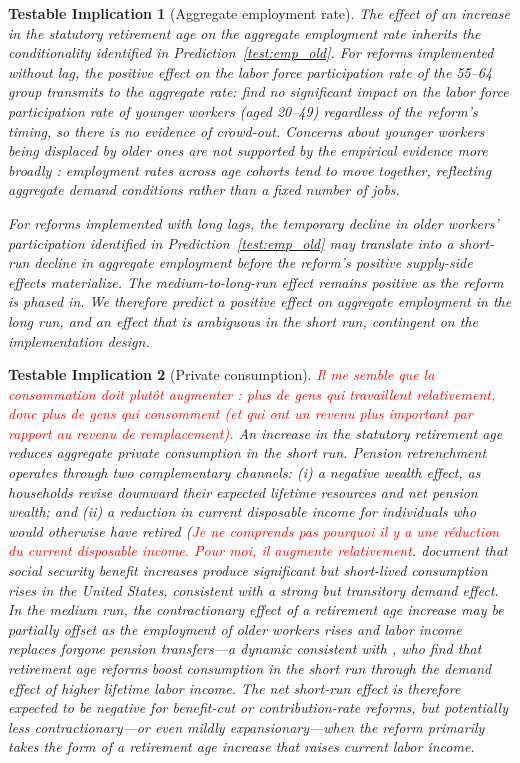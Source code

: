 \documentclass[11pt,english,a4paper, twoside, authoryear]{article}
\newtheorem{testable}{Testable Implication}
\begin{document}
\begin{testable}[Aggregate employment rate]\label{test:emp_agg}
The effect of an increase in the statutory retirement age on the aggregate employment rate inherits the conditionality identified in Prediction~\ref{test:emp_old}. For reforms implemented without lag, the positive effect on the labor force participation rate of the 55--64 group transmits to the aggregate rate: \citet{BiZubairy2023} find no significant impact on the labor force participation rate of younger workers (aged 20--49) regardless of the reform's timing, so there is no evidence of crowd-out. Concerns about younger workers being displaced by older ones are not supported by the empirical evidence more broadly \citep{MunnellWu2012}: employment rates across age cohorts tend to move together, reflecting aggregate demand conditions rather than a fixed number of jobs.

For reforms implemented with long lags, the temporary decline in older workers' participation identified in Prediction~\ref{test:emp_old} may translate into a short-run decline in aggregate employment before the reform's positive supply-side effects materialize. The medium-to-long-run effect remains positive as the reform is phased in. We therefore predict a positive effect on aggregate employment in the long run, and an effect that is ambiguous in the short run, contingent on the implementation design.
\end{testable}

\begin{testable}[Private consumption]\label{test:conso} \textcolor{red}{Il me semble que la consommation doit plutôt augmenter : plus de gens qui travaillent relativement, donc plus de gens qui consomment (et qui ont un revenu plus important par rapport au revenu de remplacement).}
An increase in the statutory retirement age reduces aggregate private consumption in the short run. Pension retrenchment operates through two complementary channels: (i) a negative wealth effect, as households revise downward their expected lifetime resources and net pension wealth; and (ii) a reduction in current disposable income for individuals who would otherwise have retired (\textcolor{red}{Je ne comprends pas pourquoi il y a une réduction du current disposable income. Pour moi, il augmente relativement}. \citet{RomerRomer2016} document that social security benefit increases produce significant but short-lived consumption rises in the United States, consistent with a strong but transitory demand effect. In the medium run, the contractionary effect of a retirement age increase may be partially offset as the employment of older workers rises and labor income replaces forgone pension transfers---a dynamic consistent with \citet{KaramMuirPereiraTuladhar2010}, who find that retirement age reforms boost consumption in the short run through the demand effect of higher lifetime labor income. The net short-run effect is therefore expected to be negative for benefit-cut or contribution-rate reforms, but potentially less contractionary---or even mildly expansionary---when the reform primarily takes the form of a retirement age increase that raises current labor income.
\end{testable}
\end{document}
